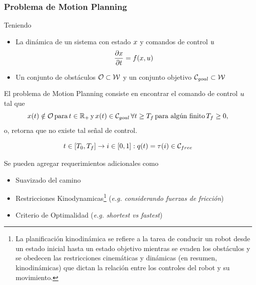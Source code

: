 \begin{frame}
    \frametitle{Problema de Motion Planning}
    
    \footnotesize
    
    Teniendo 
    \begin{itemize}
        \item La dinámica de un sistema con estado $x$ y comandos de control $u$
        \begin{equation*}
            \dfrac{\partial x}{\partial t} = f(x,u)
        \end{equation*}
        \item Un conjunto de obstáculos $\mathcal{O} \subset \mathcal{W}$ y un conjunto objetivo $\mathcal{C}_{goal} \subset \mathcal{W}$     
    \end{itemize}
    El problema de Motion Planning consiste en encontrar el comando de control $u$ tal que 
    \begin{equation*}
        x(t) \notin \mathcal{O} \, \text{para} \,  t \in \mathbb{R}_{+} \, \text{y} \, x(t) \in \mathcal{C}_{goal} \,  \forall t \ge T_{f} \, \text{para algún finito} \, T_{f} \geq 0,
    \end{equation*}    
    o, retorna que no existe tal señal de control.
    
    \begin{equation*}
        t \in [T_{0} , T_{f}] \rightarrow i \in [0, 1] : q(t) = \tau(i) \in \mathcal{C}_{free}
    \end{equation*}

    Se pueden agregar requerimientos adicionales como
    \begin{itemize}
        \item Suavizado del camino
        \item Restricciones Kinodynamicas\footnote{La planificación kinodinámica se refiere a la tarea de conducir un robot desde un estado inicial hasta un estado objetivo mientras se evaden los obstáculos y se obedecen las restricciones cinemáticas y dinámicas (en resumen, kinodinámicas) que dictan la relación entre los controles del robot y su movimiento.} (\emph{e.g. considerando fuerzas de fricción})
        \item Criterio de Optimalidad (\emph{e.g. shortest vs fastest})
    \end{itemize}
\end{frame}

